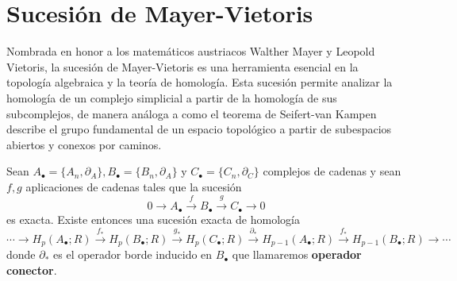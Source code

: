 \section{Sucesión de Mayer-Vietoris}
Nombrada en honor a los matemáticos austriacos Walther Mayer y Leopold Vietoris,
la sucesión de Mayer-Vietoris es una herramienta esencial en la topología algebraica
y la teoría de homología. Esta sucesión permite analizar la homología de un
complejo simplicial a partir de la homología de sus subcomplejos, de manera análoga
a como el teorema de Seifert-van Kampen describe el grupo fundamental de un espacio
topológico a partir de subespacios abiertos y conexos por caminos.
\begin{lema}
	 \label{lem:zig-zag} Sean \(A_{\bullet}= \{A_{n},\partial_{A}
	\}, B_{\bullet}= \{B_{n},\partial_{A}\}\) y \(C_{\bullet}= \{C_{n},\partial_{C}\}\)
	complejos de cadenas y sean \(f,g\) aplicaciones de cadenas tales que la sucesión
	\[
	0 \to A_{\bullet}\overset{f}{\to}B_{\bullet}\overset{g}{\to}C_{\bullet}\to 0
	\]
	es exacta. Existe entonces una sucesión exacta de homología
	\begin{equation}
		\label{eq:long-exact-hom}\cdots \to H_{p}(A_{\bullet};R) \overset{f_*}{\to}H_{p}
		(B_{\bullet};R) \overset{g_*}{\to}H_{p}(C_{\bullet};R) \overset{\partial_*}{\to}
		H_{p-1}(A_{\bullet};R) \overset{f_*}{\to}H_{p-1}(B_{\bullet};R) \to \cdots
	\end{equation}
	donde \(\partial_{*}\) es el operador borde inducido en \(B_{\bullet}\) que
	llamaremos \textbf{operador conector}.
\end{lema}
